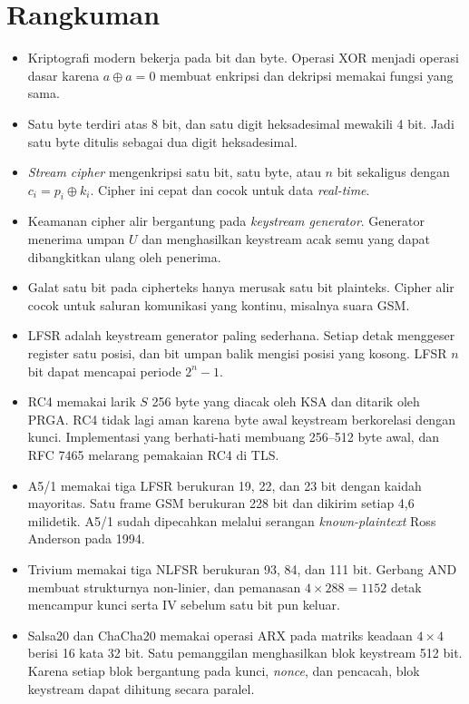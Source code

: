 \section{Rangkuman}
\begin{itemize}
    \item Kriptografi modern bekerja pada bit dan byte. Operasi XOR menjadi operasi dasar karena $a\oplus a=0$ membuat enkripsi dan dekripsi memakai fungsi yang sama.
    \item Satu byte terdiri atas 8 bit, dan satu digit heksadesimal mewakili 4 bit. Jadi satu byte ditulis sebagai dua digit heksadesimal.
    \item \textit{Stream cipher} mengenkripsi satu bit, satu byte, atau $n$ bit sekaligus dengan $c_i=p_i\oplus k_i$. Cipher ini cepat dan cocok untuk data \textit{real-time}.
    \item Keamanan cipher alir bergantung pada \textit{keystream generator}. Generator menerima umpan $U$ dan menghasilkan keystream acak semu yang dapat dibangkitkan ulang oleh penerima.
    \item Galat satu bit pada cipherteks hanya merusak satu bit plainteks. Cipher alir cocok untuk saluran komunikasi yang kontinu, misalnya suara GSM.
    \item LFSR adalah keystream generator paling sederhana. Setiap detak menggeser register satu posisi, dan bit umpan balik mengisi posisi yang kosong. LFSR $n$ bit dapat mencapai periode $2^n-1$.
    \item RC4 memakai larik $S$ 256 byte yang diacak oleh KSA dan ditarik oleh PRGA. RC4 tidak lagi aman karena byte awal keystream berkorelasi dengan kunci. Implementasi yang berhati-hati membuang 256--512 byte awal, dan RFC 7465 melarang pemakaian RC4 di TLS.
    \item A5/1 memakai tiga LFSR berukuran 19, 22, dan 23 bit dengan kaidah mayoritas. Satu frame GSM berukuran 228 bit dan dikirim setiap 4,6 milidetik. A5/1 sudah dipecahkan melalui serangan \textit{known-plaintext} Ross Anderson pada 1994.
    \item Trivium memakai tiga NLFSR berukuran 93, 84, dan 111 bit. Gerbang AND membuat strukturnya non-linier, dan pemanasan $4\times288=1152$ detak mencampur kunci serta IV sebelum satu bit pun keluar.
    \item Salsa20 dan ChaCha20 memakai operasi ARX pada matriks keadaan $4\times4$ berisi 16 kata 32 bit. Satu pemanggilan menghasilkan blok keystream 512 bit. Karena setiap blok bergantung pada kunci, \textit{nonce}, dan pencacah, blok keystream dapat dihitung secara paralel.
\end{itemize}
